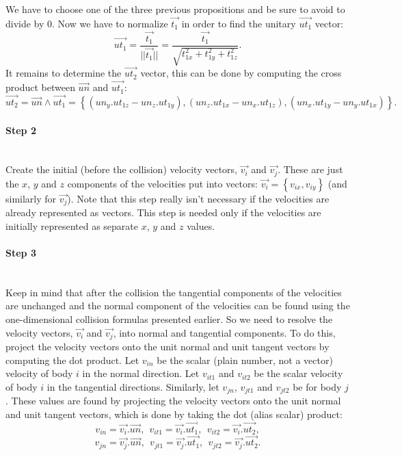 We have to choose one of the three previous propositions and be sure to avoid to divide by 0.
Now we have to normalize $\vec{t_1}$ in order to find the unitary $\vec{ut_1}$ vector:
\begin{equation*}
	\vec{ut_1} = \frac{\vec{t_1}}{||\vec{t_1}||} = \frac{\vec{t_1}}{\sqrt{t_{1x}^2 + t_{1y}^2 + t_{1z}^2}}.
\end{equation*}
It remains to determine the $\vec{ut_2}$ vector, this can be done by computing the cross product between $\vec{un}$ and $\vec{ut_1}$:
\begin{equation*}
	\vec{ut_2} = \vec{un} \wedge \vec{ut_1} = \left\{ (un_y . ut_{1z} - un_z . ut_{1y}), (un_z . ut_{1x} - un_x . ut_{1z}), (un_x . ut_{1y} - un_y . ut_{1x})\right\}.
\end{equation*}

\paragraph{Step 2}
~\\
Create the initial (before the collision) velocity vectors, $\vec{v_i}$ and $\vec{v_j}$. 
These are just the $x$, $y$ and $z$ components of the velocities put into vectors: $\vec{v_i} = \left\{ v_{ix}, v_{iy} \right\}$ (and similarly for $\vec{v_j}$). 
Note that this step really isn't necessary if the velocities are already represented as vectors. 
This step is needed only if the velocities are initially represented as separate $x$, $y$ and $z$ values.

\paragraph{Step 3}
~\\
Keep in mind that after the collision the tangential components of the velocities are unchanged and the normal component of the velocities can be found using the one-dimensional collision formulas presented earlier. 
So we need to resolve the velocity vectors, $\vec{v_i}$ and $\vec{v_j}$, into normal and tangential components. 
To do this, project the velocity vectors onto the unit normal and unit tangent vectors by computing the dot product. Let $v_{in}$ be the scalar (plain number, not a vector) velocity of body $i$ in the normal direction. 
Let $v_{it1}$ and $v_{it2}$ be the scalar velocity of body $i$ in the tangential directions. 
Similarly, let $v_{jn}$, $v_{jt1}$ and $v_{jt2}$ be for body $j$. 
These values are found by projecting the velocity vectors onto the unit normal and unit tangent vectors, which is done by taking the dot (alias scalar) product:
\begin{equation*}
	v_{in} = \vec{v_i}.\vec{un},~~v_{it1} = \vec{v_i}.\vec{ut_1},~~v_{it2} = \vec{v_i}.\vec{ut_2},
\end{equation*}
\begin{equation*}
	v_{jn} = \vec{v_j}.\vec{un},~~v_{jt1} = \vec{v_j}.\vec{ut_1},~~v_{jt2} = \vec{v_j}.\vec{ut_2}.
\end{equation*}

